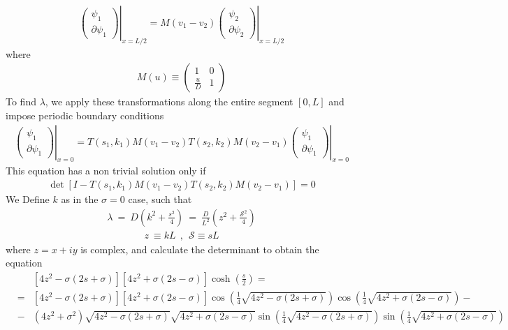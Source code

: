 \documentclass[aps,pre,floats,floatfix,fleqn,notitlepage]{revtex4-1}
\newcommand{\beq}{\begin{eqnarray}}
\newcommand{\eeq}{\end{eqnarray}}
\begin{document}
%
\beq
\left.\left( \begin{array}{c}
\psi_1 \\
\partial \psi_1
\end{array}
\right)\right|_{x=L/2} = 
%
M(v_1-v_2)
%
\left.\left( \begin{array}{c}
\psi_2 \\
\partial \psi_2
\end{array}
\right)\right|_{x=L/2}
\eeq
%
where
%
\beq
M(u) \equiv
\left( \begin{array}{cc}
1 &0  \\
\frac{u}{D} & 1
\end{array}
\right)
\eeq
%
To find $\lambda$, we apply these transformations along the entire segment $[0,L]$ and impose periodic boundary conditions
%
\beq
\left.\left( \begin{array}{c}
\psi_1 \\
\partial \psi_1
\end{array}
\right)\right|_{x=0}  = 
T(s_1,k_1) M(v_1-v_2) T(s_2,k_2) M(v_2-v_1)
\left.\left( \begin{array}{c}
\psi_1 \\
\partial \psi_1
\end{array}
\right)\right|_{x=0} 
\eeq
%
This equation has a non trivial solution only if 
%
\beq
\det \left[ I - T(s_1,k_1) M(v_1-v_2) T(s_2,k_2) M(v_2-v_1) \right] = 0
\eeq
%
We Define $k$ as in the $\sigma=0$ case, such that
%
\beq
\lambda \ = \ D\left( {k}^2 + \frac{s^2}{4}\right) \ = \ \frac{D}{L^2}\left( {z}^2 + \frac{\mathcal{S}^2}{4}\right) 
\eeq
%
%
\beq
z \  \equiv  {k}L \ \ , \ \ \mathcal{S} \equiv sL
\eeq
%
where $z=x+iy$ is complex,
and calculate the determinant to obtain  the equation
%
\beq
& & 
\left[4z^2-\sigma(2s+\sigma)\right]
\left[4z^2 +\sigma(2s - \sigma) \right]
\cosh\left(\frac{s}{2}\right) = \\
&=&
\left[4z^2-\sigma(2s+\sigma)\right]
\left[4z^2 +\sigma(2s - \sigma) \right]
\cos \left(\frac{1}{4} \sqrt{4z^2-\sigma(2s+\sigma)}\right) 
\cos \left(\frac{1}{4} \sqrt{4z^2 +\sigma(2s - \sigma)}\right)  -\\
&-& 
(4z^2+\sigma^2) \sqrt{4z^2-\sigma(2s+\sigma)}
\sqrt{4z^2 +\sigma(2s - \sigma)}
\sin \left(\frac{1}{4} \sqrt{4z^2-\sigma(2s+\sigma)}\right) 
\sin \left(\frac{1}{4} \sqrt{4z^2 +\sigma(2s - \sigma)}\right)  
\eeq
%
\end{document}
